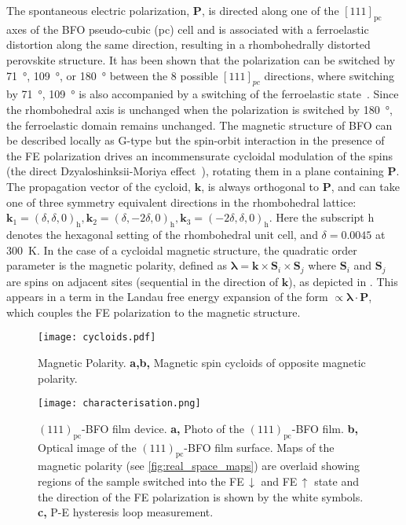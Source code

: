 \documentclass[aps,prb,twocolumn,showpacs,superscriptaddress, longbibliography, 10pt]{revtex4-1}
\begin{document}
The spontaneous electric polarization, $\mathbf{P}$, is directed along one of the $[111]_\mathrm{pc}$ axes of the BFO pseudo-cubic (pc) cell and is associated with a ferroelastic distortion along the same direction, resulting in a rhombohedrally distorted perovskite structure. It has been shown that the polarization can be switched by \SI{71}{\degree}, \SI{109}{\degree}, or \SI{180}{\degree} between the 8 possible $[111]_{pc}$ directions, where switching by \SI{71}{\degree}, \SI{109}{\degree} is also accompanied by a switching of the ferroelastic state~\cite{zavaliche2006multiferroic}. Since the rhombohedral axis is unchanged when the polarization is switched by \SI{180}{\degree}, the ferroelastic domain remains unchanged. The magnetic structure of BFO can be described locally as G-type but the spin-orbit interaction in the presence of the FE polarization drives an incommensurate cycloidal modulation of the spins (the direct Dzyaloshinksii-Moriya effect~\cite{kadomtseva2004space}), rotating them in a plane containing  $\mathbf{P}$. The propagation vector of the cycloid, $\mathbf{k}$, is always orthogonal to $\mathbf{P}$, and can take one of three symmetry equivalent directions in the rhombohedral lattice: $\mathbf{k}_1 = (\delta, \delta, 0)_\mathrm{h}, \mathbf{k}_2 = (\delta, -2 \delta, 0)_\mathrm{h}, \mathbf{k}_3 = (-2 \delta, \delta, 0)_\mathrm{h}$. Here the subscript h denotes the hexagonal setting of the rhombohedral unit cell, and $\delta = 0.0045$ at \SI{300}{\kelvin}. In the case of a cycloidal magnetic structure, the quadratic order parameter is the magnetic polarity,  defined as $\boldsymbol{\lambda} = \mathbf{k} \times \mathbf{S}_i \times \mathbf{S}_j$ where $\mathbf{S}_i$ and $\mathbf{S}_j$ are spins on adjacent sites (sequential in the direction of $\mathbf{k}$), as depicted in . This appears in a term in the Landau free energy expansion of the form $\propto \boldsymbol{\lambda} \cdot \mathbf{P}$, which couples the FE polarization to the magnetic structure.

\begin{figure}[h!]
\texttt{[image: cycloids.pdf]}
\caption{\label{fig:magpol} Magnetic Polarity. \textbf{a,b,} Magnetic spin cycloids of opposite magnetic polarity.}
\end{figure}


\begin{figure}[h]
\texttt{[image: characterisation.png]}
\caption{\label{fig:char} $(111)_\mathrm{pc}$-BFO film device. \textbf{a,} Photo of the $(111)_\mathrm{pc}$-BFO film. \textbf{b,} Optical image of the $(111)_\mathrm{pc}$-BFO film surface. Maps of the magnetic polarity (see \cref{fig:real_space_maps}) are overlaid showing regions of the sample switched into the FE\,$\downarrow$ and FE\,$\uparrow$ state and the direction of the FE polarization is shown by the white symbols. \textbf{c,} P-E hysteresis loop measurement. }
\end{figure}
\end{document}
